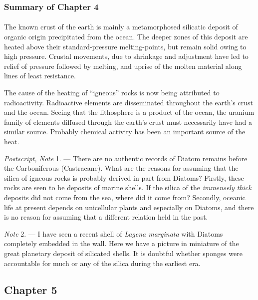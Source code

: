 \documentclass[a4paper, 12pt, oneside]{article}
\begin{document}
\subsubsection{Summary of Chapter 4} 
\paragraph{}
The known crust of the earth is mainly a metamorphosed silicatic deposit of organic origin precipitated from the ocean. The deeper zones of this deposit are heated above their standard-pressure melting-points, but remain solid owing to high pressure. Crustal movements, due to shrinkage and adjustment have led to relief of pressure followed by melting, and uprise of the molten material along lines of least resistance.

The cause of the heating of ``igneous'' rocks is now being attributed to radioactivity. Radioactive elements are disseminated throughout the earth's crust and the ocean. Seeing that the lithosphere is a product of the ocean, the uranium family of elements diffused through the earth's crust must necessarily have had a similar source. Probably chemical activity has been an important source of the heat.

\emph{Postscript, Note} 1. --- There are no authentic records of Diatom remains before the Carboniferous (Castracane). What are the reasons for assuming that the silica of igneous rocks is probably derived in part from Diatoms? Firstly, these rocks are seen to be deposits of marine shells. If the silica of the \emph{immensely thick} deposits did not come from the sea, where did it come from? Secondly, oceanic life at present depends on unicellular plants and especially on Diatoms, and there is no reason for assuming that a different relation held in the past.

\emph{Note} 2. --- I have seen a recent shell of \emph{Lagena marginata} with Diatoms completely embedded in the wall. Here we have a picture in miniature of the great planetary deposit of silicated shells. It is doubtful whether sponges were accountable for much or any of the silica during the earliest era.
\clearpage
\subsection{Chapter 5}
\end{document}
